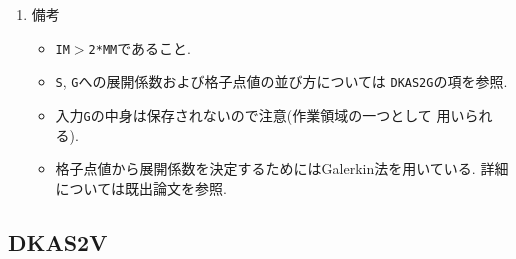 \documentclass[a4j,fleqn]{jarticle}
\begin{document}
\begin{enumerate}
\item 備考

\begin{itemize}

\item {\tt IM}$>${\tt 2*MM}であること.

\item {\tt S}, {\tt G}への展開係数および格子点値の並び方については
{\tt DKAS2G}の項を参照.

\item 入力{\tt G}の中身は保存されないので注意(作業領域の一つとして
用いられる).

\item 格子点値から展開係数を決定するためにはGalerkin法を用いている.
詳細については既出論文を参照.

\end{itemize}

\end{enumerate}


\subsection{DKAS2V}
\end{document}

